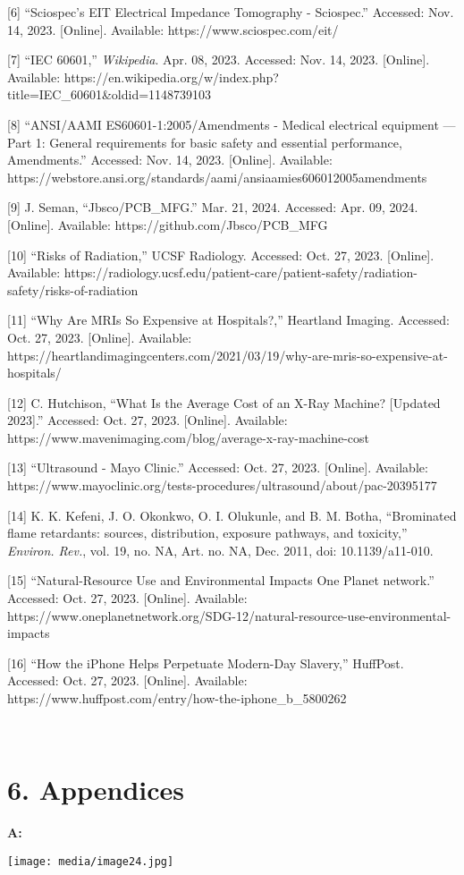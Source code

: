 {[}6{]} ``Sciospec's EIT Electrical Impedance Tomography - Sciospec.''
Accessed: Nov. 14, 2023. {[}Online{]}. Available:
https://www.sciospec.com/eit/

{[}7{]} ``IEC 60601,'' \emph{Wikipedia}. Apr. 08, 2023. Accessed: Nov.
14, 2023. {[}Online{]}. Available:
https://en.wikipedia.org/w/index.php?title=IEC\_60601\&oldid=1148739103

{[}8{]} ``ANSI/AAMI ES60601-1:2005/Amendments - Medical electrical
equipment --- Part 1: General requirements for basic safety and
essential performance, Amendments.'' Accessed: Nov. 14, 2023.
{[}Online{]}. Available:
https://webstore.ansi.org/standards/aami/ansiaamies606012005amendments

{[}9{]} J. Seman, ``Jbsco/PCB\_MFG.'' Mar. 21, 2024. Accessed: Apr. 09,
2024. {[}Online{]}. Available: https://github.com/Jbsco/PCB\_MFG

{[}10{]} ``Risks of Radiation,'' UCSF Radiology. Accessed: Oct. 27,
2023. {[}Online{]}. Available:
https://radiology.ucsf.edu/patient-care/patient-safety/radiation-safety/risks-of-radiation

{[}11{]} ``Why Are MRIs So Expensive at Hospitals?,'' Heartland Imaging.
Accessed: Oct. 27, 2023. {[}Online{]}. Available:
https://heartlandimagingcenters.com/2021/03/19/why-are-mris-so-expensive-at-hospitals/

{[}12{]} C. Hutchison, ``What Is the Average Cost of an X-Ray Machine?
{[}Updated 2023{]}.'' Accessed: Oct. 27, 2023. {[}Online{]}. Available:
https://www.mavenimaging.com/blog/average-x-ray-machine-cost

{[}13{]} ``Ultrasound - Mayo Clinic.'' Accessed: Oct. 27, 2023.
{[}Online{]}. Available:
https://www.mayoclinic.org/tests-procedures/ultrasound/about/pac-20395177

{[}14{]} K. K. Kefeni, J. O. Okonkwo, O. I. Olukunle, and B. M. Botha,
``Brominated flame retardants: sources, distribution, exposure pathways,
and toxicity,'' \emph{Environ. Rev.}, vol. 19, no. NA, Art. no. NA, Dec.
2011, doi: 10.1139/a11-010.

{[}15{]} ``Natural-Resource Use and Environmental Impacts \textbar{} One
Planet network.'' Accessed: Oct. 27, 2023. {[}Online{]}. Available:
https://www.oneplanetnetwork.org/SDG-12/natural-resource-use-environmental-impacts

{[}16{]} ``How the iPhone Helps Perpetuate Modern-Day Slavery,''
HuffPost. Accessed: Oct. 27, 2023. {[}Online{]}. Available:
https://www.huffpost.com/entry/how-the-iphone\_b\_5800262

~

\section*{6. Appendices~}\label{appendices}

\textbf{A:}

\texttt{[image: media/image24.jpg]}

